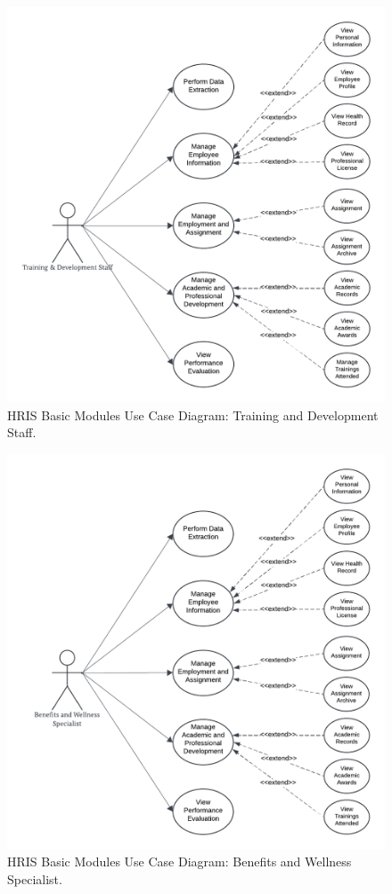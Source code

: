     \begin{figure}[H]
        \centering
        \includegraphics[width=0.9\linewidth]{figures/images/use-case-basic-5.png}
        \caption{HRIS Basic Modules Use Case Diagram: Training and Development Staff.}
        \label{fig:use-case-basic-5}
    \end{figure}

    \begin{figure}[H]
        \centering
        \includegraphics[width=0.9\linewidth]{figures/images/use-case-basic-6.png}
        \caption{HRIS Basic Modules Use Case Diagram: Benefits and Wellness Specialist.}
        \label{fig:use-case-basic-6}
    \end{figure}

